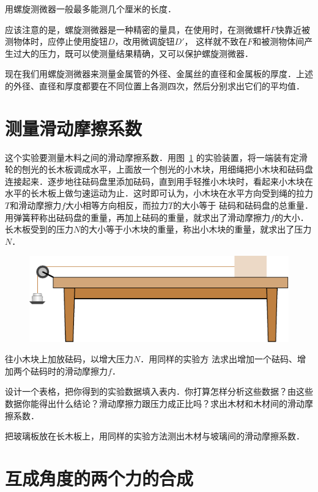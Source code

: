 用螺旋测微器一般最多能测几个厘米的长度．

应该注意的是，螺旋测微器是一种精密的量具，在使用时，在测微螺杆$F$快靠近被测物体时，应停止使用旋钮$D$，改用微调旋钮$D'$， 这样就不致在$F$和被测物体间产生过大的压力，既可以使测量结果精确，又可以保护螺旋测微器．

现在我们用螺旋测微器来测量金属管的外径、金属丝的直径和金属板的厚度．上述的外径、直径和厚度都要在不同位置上各测四次，然后分别求出它们的平均值．

\section{测量滑动摩擦系数}

这个实验要测量木料之间的滑动摩擦系数．用图~\ref{fig_A_10-6} 的实验装置，将一端装有定滑轮的刨光的长木板调成水平，上面放一个刨光的小木块，用细绳把小木块和砝码盘连接起来．逐步地往砝码盘里添加砝码，直到用手轻推小木块时，看起来小木块在水平的长木板上做匀速运动为止．这时即可认为，小木块在水平方向受到绳的拉力$T$和滑动摩擦力$f$大小相等方向相反，而拉力$T$的大小等于	
砝码和砝码盘的总重量．用弹簧秤称出砝码盘的重量，再加上砝码的重量，就求出了滑动摩擦力$f$的大小．长木板受到的压力$N$的大小等于小木块的重量，称出小木块的重量，就求出了压力$N$．
\begin{figure}[htbp]
    \centering
    \includegraphics{fig/A/10-6.pdf}
    \caption{}\label{fig_A_10-6}
\end{figure}

往小木块上加放砝码，以增大压力$N$．用同样的实验方
法求出增加一个砝码、增加两个砝码时的滑动摩擦力$f$．

设计一个表格，把你得到的实验数据填入表内．你打算怎样分析这些数据？由这些数据你能得出什么结论？滑动摩擦力跟压力成正比吗？求出木材和木材间的滑动摩擦系数．

把玻璃板放在长木板上，用同样的实验方法测出木材与坡璃间的滑动摩擦系数．

\section{互成角度的两个力的合成}

